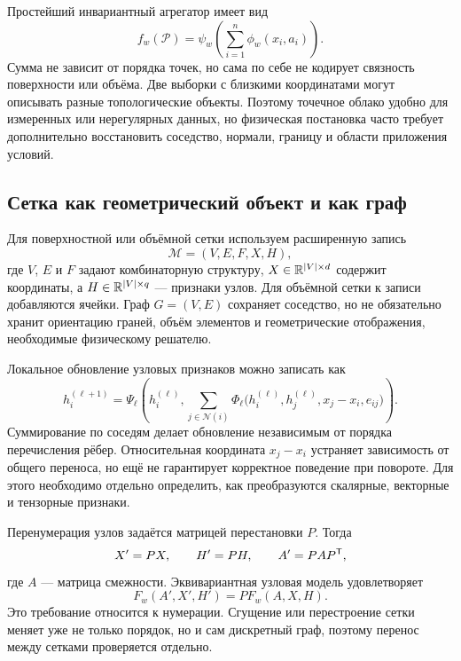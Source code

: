 Простейший инвариантный агрегатор имеет вид
\begin{equation}
 f_w(\mathcal P)
 =
 \psi_w\left(
 \sum_{i=1}^{n}
 \phi_w(x_i,a_i)
 \right).
\end{equation}
Сумма не зависит от порядка точек, но сама по себе не кодирует связность поверхности или объёма. Две выборки с близкими координатами могут описывать разные топологические объекты. Поэтому точечное облако удобно для измеренных или нерегулярных данных, но физическая постановка часто требует дополнительно восстановить соседство, нормали, границу и области приложения условий.

\subsection{Сетка как геометрический объект и как граф}
Для поверхностной или объёмной сетки используем расширенную запись
\begin{equation}
 \mathcal M=(V,E,F,X,H),
\end{equation}
где $V$, $E$ и $F$ задают комбинаторную структуру, $X\in\mathbb{R}^{|V|\times d}$ содержит координаты, а $H\in\mathbb{R}^{|V|\times q}$ --- признаки узлов. Для объёмной сетки к записи добавляются ячейки. Граф $G=(V,E)$ сохраняет соседство, но не обязательно хранит ориентацию граней, объём элементов и геометрические отображения, необходимые физическому решателю.

Локальное обновление узловых признаков можно записать как
\begin{equation}
 h_i^{(\ell+1)}
 =
 \Psi_{\ell}\left(
 h_i^{(\ell)},
 \sum_{j\in\mathcal N(i)}
 \Phi_{\ell}
 \bigl(h_i^{(\ell)},h_j^{(\ell)},x_j-x_i,e_{ij}\bigr)
 \right).
\end{equation}
Суммирование по соседям делает обновление независимым от порядка перечисления рёбер. Относительная координата $x_j-x_i$ устраняет зависимость от общего переноса, но ещё не гарантирует корректное поведение при повороте. Для этого необходимо отдельно определить, как преобразуются скалярные, векторные и тензорные признаки.

Перенумерация узлов задаётся матрицей перестановки $P$. Тогда
\begin{equation}
 X'=PX,
 \qquad
 H'=PH,
 \qquad
 A'=PAP^{\mathsf{T}},
\end{equation}
где $A$ --- матрица смежности. Эквивариантная узловая модель удовлетворяет
\begin{equation}
 F_w(A',X',H')
 =
 P F_w(A,X,H).
\end{equation}
Это требование относится к нумерации. Сгущение или перестроение сетки меняет уже не только порядок, но и сам дискретный граф, поэтому перенос между сетками проверяется отдельно.

